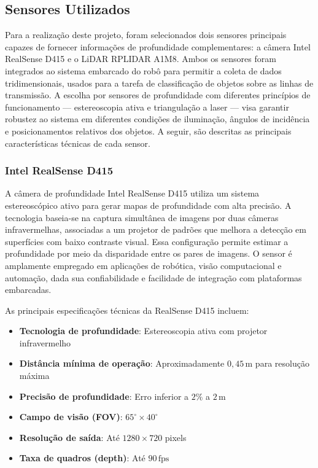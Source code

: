 \subsection{Sensores Utilizados}

Para a realização deste projeto, foram selecionados dois sensores principais capazes de fornecer informações de profundidade complementares: a câmera Intel RealSense D415 e o LiDAR RPLIDAR A1M8. Ambos os sensores foram integrados ao sistema embarcado do robô para permitir a coleta de dados tridimensionais, usados para a tarefa de classificação de objetos sobre as linhas de transmissão. A escolha por sensores de profundidade com diferentes princípios de funcionamento — estereoscopia ativa e triangulação a laser — visa garantir robustez ao sistema em diferentes condições de iluminação, ângulos de incidência e posicionamentos relativos dos objetos. A seguir, são descritas as principais características técnicas de cada sensor.

\subsubsection{Intel RealSense D415}

A câmera de profundidade Intel RealSense D415 utiliza um sistema estereoscópico ativo para gerar mapas de profundidade com alta precisão. A tecnologia baseia-se na captura simultânea de imagens por duas câmeras infravermelhas, associadas a um projetor de padrões que melhora a detecção em superfícies com baixo contraste visual. Essa configuração permite estimar a profundidade por meio da disparidade entre os pares de imagens. O sensor é amplamente empregado em aplicações de robótica, visão computacional e automação, dada sua confiabilidade e facilidade de integração com plataformas embarcadas.


As principais especificações técnicas da RealSense D415 incluem:

\begin{itemize}
    \item \textbf{Tecnologia de profundidade}: Estereoscopia ativa com projetor infravermelho
    \item \textbf{Distância mínima de operação}: Aproximadamente $0{,}45\,\text{m}$ para resolução máxima
    \item \textbf{Precisão de profundidade}: Erro inferior a $2\%$ a $2\,\text{m}$
    \item \textbf{Campo de visão (FOV)}: $65^\circ \times 40^\circ$
    \item \textbf{Resolução de saída}: Até $1280 \times 720$ pixels
    \item \textbf{Taxa de quadros (depth)}: Até $90\,\text{fps}$
\end{itemize}

